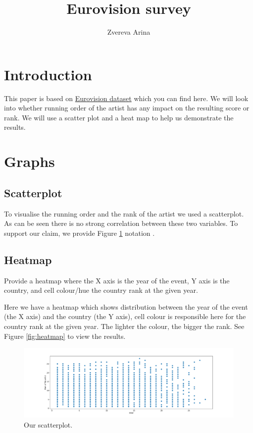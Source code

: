 \documentclass{article}
\title{Eurovision survey}
\author{Zvereva Arina}
\begin{document}
\maketitle

\section{Introduction}
This paper is based on \href{https://github.com/rfordatascience/tidytuesday/blob/master/data/2022/2022-05-17/eurovision.csv}{Eurovision dataset} which you can find here. We will look into whether running order of the artist has any impact on the resulting score or rank. We will use a scatter plot and a heat map to help us demonstrate the results. 

\section{Graphs}

\subsection{Scatterplot}

To visualise the running order and the rank of the artist we used a scatterplot. As can be seen there is no strong correlation between these two variables. To support our claim, we provide Figure \ref{fig:scatter} notation .

\subsection{Heatmap}

Provide a heatmap where the X axis is the year of the event, Y axis is the country, and cell colour/hue the country rank at the given year.

Here we have a heatmap which shows distribution between the year of the event (the X axis) and the country (the Y axis), cell colour is responsible here for the country rank at the given year. The lighter the colour, the bigger the rank. See Figure \ref{fig:heatmap} to view the results. 


\begin{figure}
\centering
\includegraphics[width=1\textwidth]{figscatter.pdf}
\caption{\label{fig:scatter} Our scatterplot.}    
\end{figure}
\end{document}
